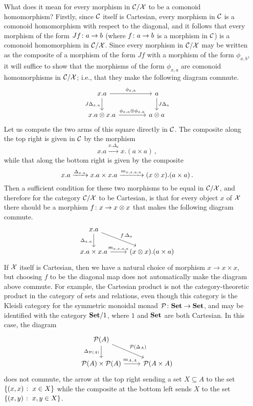 \documentclass{article}
\begin{document}
What does it mean for every morphism in ${\mathcal{C}}/\mathcal X$ to be a comonoid homomorphism?  
Firstly, since ${\mathcal{C}}$ itself is Cartesian, every morphism in ${\mathcal{C}}$ is a comonoid homomorphism with respect to the diagonal, and it follows that every morphism of the form $Jf \colon a \to b$ (where $f\colon a \to b$ is a morphism in ${\mathcal{C}}$) is a comonoid homomorphism in ${\mathcal{C}}/\mathcal X$.  
Since every morphism in ${\mathcal{C}}/\mathcal X$ may be written as the composite of a morphism of the form $Jf$ with a morphism of the form $\phi_{x,b}$, it will suffice to show that the morphisms of the form $\phi_{x,a}$ are comonoid homomorphisms in ${\mathcal{C}}/\mathcal X$; i.e., that they make the following diagram commute.
\[
  \begin{tikzcd}[column sep=40pt]
    x.a \arrow[r, "{\phi_{x,a}}"] \arrow[d, "J\Delta_{x.a}"']
      & a \arrow[d, "J\Delta_a"] \\
    x.a \tensor x.a \arrow[r, "{\phi_{x,a}\tensor\phi_{x,a}}"]
      & a \tensor a
  \end{tikzcd}
  \]
Let us compute the two arms of this square directly in ${\mathcal{C}}$.  
The composite along the top right is given in ${\mathcal{C}}$ by the morphism
\[
  x.a \xrightarrow{x.\Delta_a}
  x.(a\times a)\,,
  \]
while that along the bottom right is given by the composite
\[
  x.a \xrightarrow{\Delta_{x.a}}
  x.a \times x.a \xrightarrow{m_{x,x,a,a}}
  (x\otimes x) . (a \times a)\,.
  \]
Then a sufficient condition for these two morphisms to be equal in ${\mathcal{C}}/\mathcal X$, and therefore for the category ${\mathcal{C}}/\mathcal X$ to be Cartesian, is that for every object $x$ of $\mathcal X$ there should be a morphism $f \colon x \to x\otimes x$ that makes the following diagram commute.
\[
  \begin{tikzcd}
    x.a \arrow[dr, "f.\Delta_a"] \arrow[d, "\Delta_{x.a}"']
      & \\
    x.a \times x.a \arrow[r, "{m_{x,x,a,a}}"]
      & (x\tensor x). (a\times a)
  \end{tikzcd}
  \]
If $\mathcal X$ itself is Cartesian, then we have a natural choice of morphism $x \to x \times x$, but choosing $f$ to be the diagonal map does not automatically make the diagram above commute.  
For example, the Cartesian product is not the category-theoretic product in the category of sets and relations, even though this category is the Kleisli category for the symmetric monoidal monad $\mathcal P \colon {\normalfont\textbf{Set}} \to {\normalfont\textbf{Set}}$, and may be identified with the category ${\normalfont\textbf{Set}}/1$, where $1$ and ${\normalfont\textbf{Set}}$ are both Cartesian.  
In this case, the diagram
\[
  \begin{tikzcd}
    \powerset(A) \arrow[dr, "\powerset(\Delta_A)"] \arrow[d, "\Delta_{\powerset(A)}"']
      & \\
    \powerset(A) \times \powerset(A) \arrow[r, "{m_{A,A}}" xshift=-3pt]
      & \powerset(A \times A)
  \end{tikzcd}
  \]
does not commute, the arrow at the top right sending a set $X\subseteq A$ to the set $\{(x,x) \;\colon\; x \in X\}$ while the composite at the bottom left sends $X$ to the set $\{(x,y)\;\colon\; x,y\in X\}$.
\end{document}
